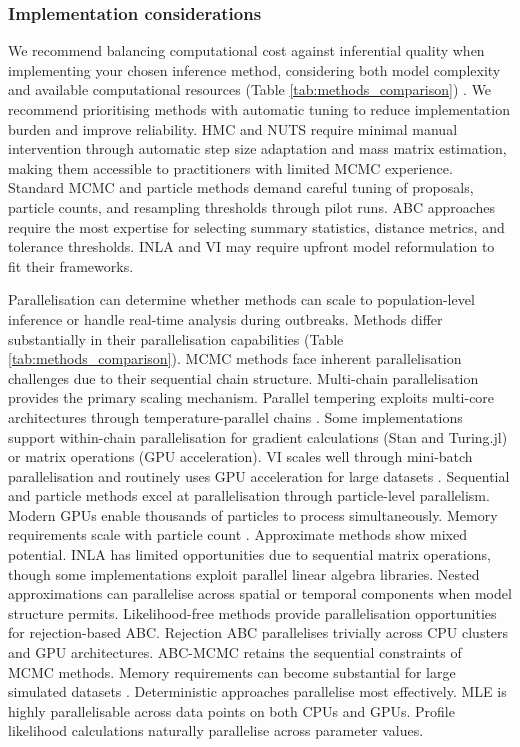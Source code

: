 \documentclass{article}
\begin{document}
\subsubsection{Implementation considerations}

We recommend balancing computational cost against inferential quality when implementing your chosen inference method, considering both model complexity and available computational resources (Table \ref{tab:methods_comparison}) \citep{funk2020choices}.
We recommend prioritising methods with automatic tuning to reduce implementation burden and improve reliability.
HMC and NUTS require minimal manual intervention through automatic step size adaptation and mass matrix estimation, making them accessible to practitioners with limited MCMC experience.
Standard MCMC and particle methods demand careful tuning of proposals, particle counts, and resampling thresholds through pilot runs.
ABC approaches require the most expertise for selecting summary statistics, distance metrics, and tolerance thresholds.
INLA and VI may require upfront model reformulation to fit their frameworks.

Parallelisation can determine whether methods can scale to population-level inference or handle real-time analysis during outbreaks.
Methods differ substantially in their parallelisation capabilities (Table \ref{tab:methods_comparison}).
MCMC methods face inherent parallelisation challenges due to their sequential chain structure.
Multi-chain parallelisation provides the primary scaling mechanism.
Parallel tempering exploits multi-core architectures through temperature-parallel chains \citep{surjanovic2023pigeons}.
Some implementations support within-chain parallelisation for gradient calculations (Stan and Turing.jl) or matrix operations (GPU acceleration).
VI scales well through mini-batch parallelisation and routinely uses GPU acceleration for large datasets \citep{hoffman2013stochastic, Abbott2021-delta}.
Sequential and particle methods excel at parallelisation through particle-level parallelism.
Modern GPUs enable thousands of particles to process simultaneously.
Memory requirements scale with particle count \citep{henriksen2012parallel}.
Approximate methods show mixed potential.
INLA has limited opportunities due to sequential matrix operations, though some implementations exploit parallel linear algebra libraries.
Nested approximations can parallelise across spatial or temporal components when model structure permits.
Likelihood-free methods provide parallelisation opportunities for rejection-based ABC.
Rejection ABC parallelises trivially across CPU clusters and GPU architectures.
ABC-MCMC retains the sequential constraints of MCMC methods.
Memory requirements can become substantial for large simulated datasets \citep{kulkarni2022hardware}.
Deterministic approaches parallelise most effectively.
MLE is highly parallelisable across data points on both CPUs and GPUs.
Profile likelihood calculations naturally parallelise across parameter values.
\end{document}
